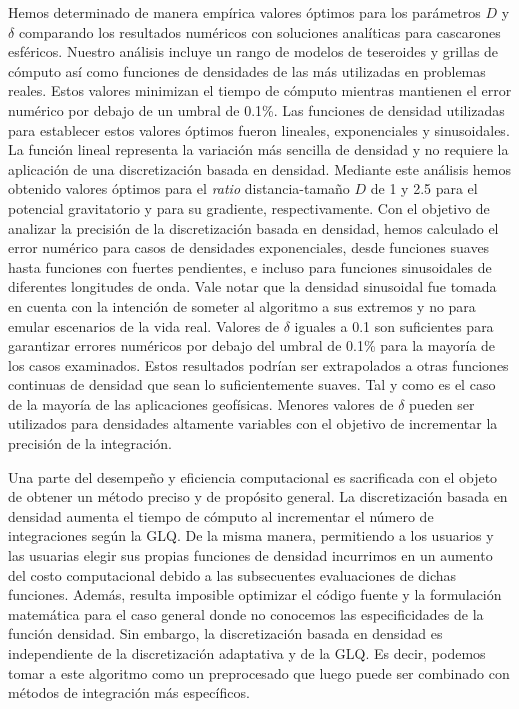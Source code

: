 Hemos determinado de manera empírica valores óptimos para los parámetros $D$
y $\delta$ comparando los resultados numéricos con soluciones analíticas para
cascarones esféricos.
Nuestro análisis incluye un rango de modelos de teseroides y grillas de
cómputo así como funciones de densidades de las más utilizadas en problemas
reales.
Estos valores minimizan el tiempo de cómputo mientras mantienen el error
numérico por debajo de un umbral de 0.1\%.
Las funciones de densidad utilizadas para establecer estos valores óptimos
fueron lineales, exponenciales y sinusoidales.
La función lineal representa la variación más sencilla de densidad y no
requiere la aplicación de una discretización basada en densidad.
Mediante este análisis hemos obtenido valores óptimos para el \emph{ratio}
distancia-tamaño $D$ de 1 y 2.5 para el potencial gravitatorio y para su
gradiente, respectivamente.
Con el objetivo de analizar la precisión de la discretización basada en
densidad, hemos calculado el error numérico para casos de densidades
exponenciales, desde funciones suaves hasta funciones con fuertes pendientes,
e incluso para funciones sinusoidales de diferentes longitudes de onda.
Vale notar que la densidad sinusoidal fue tomada en cuenta con la intención de
someter al algoritmo a sus extremos y no para emular escenarios de la vida
real.
Valores de $\delta$ iguales a 0.1 son suficientes para garantizar errores
numéricos por debajo del umbral de 0.1\% para la mayoría de los casos
examinados.
Estos resultados podrían ser extrapolados a otras funciones continuas de
densidad que sean lo suficientemente suaves. Tal y como es el caso de la
mayoría de las aplicaciones geofísicas.
Menores valores de $\delta$ pueden ser utilizados para densidades altamente
variables con el objetivo de incrementar la precisión de la integración.

Una parte del desempeño y eficiencia computacional es sacrificada con el objeto
de obtener un método preciso y de propósito general.
La discretización basada en densidad aumenta el tiempo de cómputo al
incrementar el número de integraciones según la \ac{GLQ}.
De la misma manera, permitiendo a los usuarios y las usuarias elegir sus
propias funciones de densidad incurrimos en un aumento del costo computacional
debido a las subsecuentes evaluaciones de dichas funciones.
Además, resulta imposible optimizar el código fuente y la formulación
matemática para el caso general donde no conocemos las especificidades de la
función densidad.
Sin embargo, la discretización basada en densidad es independiente de la
discretización adaptativa y de la \ac{GLQ}.
Es decir, podemos tomar a este algoritmo como un preprocesado que luego puede
ser combinado con métodos de integración más específicos.

